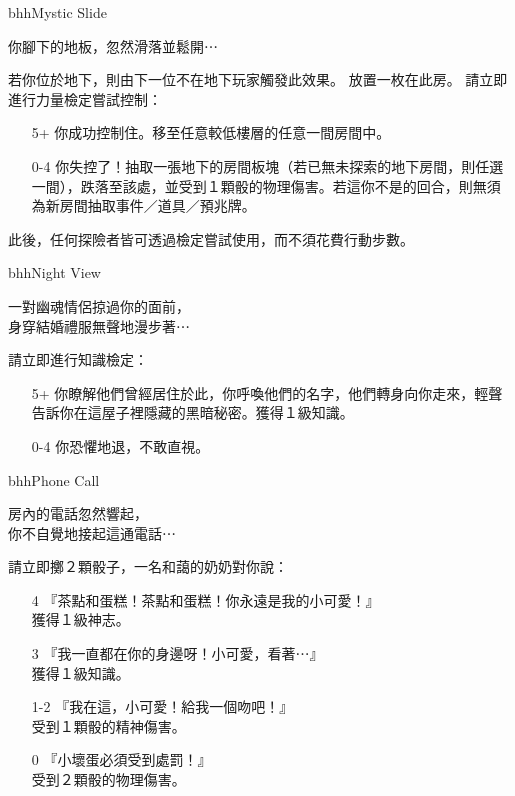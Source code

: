 \begin{EventCard}{bhh}{Mystic Slide}
  \begin{CardStory}
    你腳下的地板，忽然滑落並鬆開⋯
  \end{CardStory}
  \footnotesize
  若你位於地下，則由下一位不在地下玩家觸發此效果。\smallbreak
  放置一枚在此房。\smallbreak
  請立即進行力量檢定嘗試控制：
  \begin{itemize}
    \item[5+] 你成功控制住。移至任意較低樓層的任意一間房間中。
    \item[0-4] 你失控了！抽取一張地下的房間板塊（若已無未探索的地下房間，則任選一間），跌落至該處，並受到１顆骰的物理傷害。若這你不是的回合，則無須為新房間抽取事件／道具／預兆牌。
  \end{itemize}
  此後，任何探險者皆可透過檢定嘗試使用，而不須花費行動步數。\smallbreak
\end{EventCard}%
\linebreak[0]%
\begin{EventCard}{bhh}{Night View}
  \begin{CardStory}
    一對幽魂情侶掠過你的面前，\\
    身穿結婚禮服無聲地漫步著⋯
  \end{CardStory}
  請立即進行知識檢定：
  \begin{itemize}
    \item[5+] 你瞭解他們曾經居住於此，你呼喚他們的名字，他們轉身向你走來，輕聲告訴你在這屋子裡隱藏的黑暗秘密。獲得１級知識。
    \item[0-4] 你恐懼地退，不敢直視。
  \end{itemize}
\end{EventCard}%
\linebreak[0]%
\begin{EventCard}{bhh}{Phone Call}
  \begin{CardStory}
    房內的電話忽然響起，\\
    你不自覺地接起這通電話⋯
  \end{CardStory}
  請立即擲２顆骰子，一名和藹的奶奶對你說：
  \begin{itemize}
    \item[4] 『茶點和蛋糕！茶點和蛋糕！你永遠是我的小可愛！』\\
獲得１級神志。
    \item[3] 『我一直都在你的身邊呀！小可愛，看著⋯』\\
獲得１級知識。
    \item[1-2] 『我在這，小可愛！給我一個吻吧！』\\
受到１顆骰的精神傷害。
    \item[0] 『小壞蛋必須受到處罰！』\\
受到２顆骰的物理傷害。
  \end{itemize}
\end{EventCard}%
